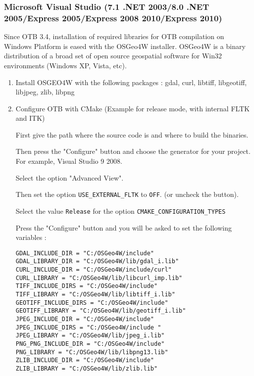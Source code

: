 \subsubsection{Microsoft Visual Studio (7.1 .NET 2003/8.0 .NET 2005/Express 2005/Express 2008 2010/Express 2010)}
Since OTB 3.4, installation of required libraries for OTB compilation on Windows Platform is eased with the  
OSGeo4W installer. OSGeo4W is a binary distribution of a broad set of open source geospatial software 
for Win32 environments (Windows XP, Vista, etc).
\begin{enumerate}

\item Install OSGEO4W with the following packages : gdal, curl, libtiff, libgeotiff, libjpeg, zlib, libpng

\item Configure OTB with CMake (Example for release mode, with internal FLTK and ITK)

    First give the path where the source code is and where to build the binaries.

    Then press the "Configure" button and choose the generator for your project. For example, Visual Studio 9 2008.

    Select the option "Advanced View".

    Then set the option \texttt{USE\_EXTERNAL\_FLTK} to \texttt{OFF}. (or uncheck the button).

    Select the value \texttt{Release} for the option \texttt{CMAKE\_CONFIGURATION\_TYPES}

    Press the "Configure" button and you will be asked to set the following variables :

        \texttt{GDAL\_INCLUDE\_DIR = "C:/OSGeo4W/include"}\\
        \texttt{GDAL\_LIBRARY\_DIR = "C:/OSGeo4W/lib/gdal\_i.lib"}\\
        \texttt{CURL\_INCLUDE\_DIR = "C:/OSGeo4W/include/curl"}\\
        \texttt{CURL\_LIBRARY = "C:/OSGeo4W/lib/libcurl\_imp.lib"}\\
        \texttt{TIFF\_INCLUDE\_DIRS = "C:/OSGeo4W/include"}\\
        \texttt{TIFF\_LIBRARY = "C:/OSGeo4W/lib/libtiff\_i.lib"}\\
        \texttt{GEOTIFF\_INCLUDE\_DIRS = "C:/OSGeo4W/include"}\\
        \texttt{GEOTIFF\_LIBRARY = "C:/OSGeo4W/lib/geotiff\_i.lib"}\\
        \texttt{JPEG\_INCLUDE\_DIR = "C:/OSGeo4W/include" }\\
        \texttt{JPEG\_INCLUDE\_DIRS = "C:/OSGeo4W/include "}\\
        \texttt{JPEG\_LIBRARY = "C:/OSGeo4W/lib/jpeg\_i.lib"}\\
        \texttt{PNG\_PNG\_INCLUDE\_DIR = "C:/OSGeo4W/include" }\\
        \texttt{PNG\_LIBRARY = "C:/OSGeo4W/lib/libpng13.lib"}\\
        \texttt{ZLIB\_INCLUDE\_DIR = "C:/OSGeo4W/include"}\\
        \texttt{ZLIB\_LIBRARY = "C:/OSGeo4W/lib/zlib.lib"}


\end{enumerate}
